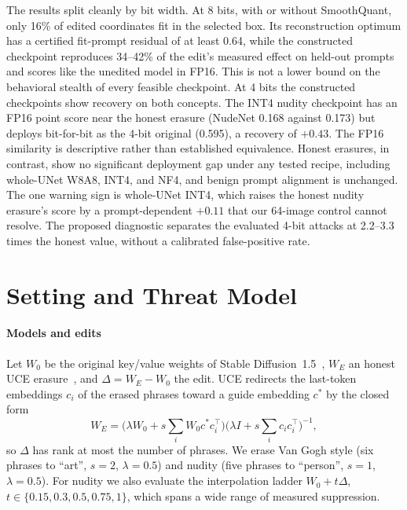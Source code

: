 \documentclass[conference]{IEEEtran}
\begin{document}
The results split cleanly by bit width. At 8 bits, with or without SmoothQuant, only
16\% of edited coordinates fit in the selected box. Its reconstruction optimum has
a certified fit-prompt residual of at least 0.64, while the constructed checkpoint
reproduces 34--42\% of the edit's measured effect on held-out prompts and scores
like the unedited model in FP16. This is not a lower bound on the behavioral stealth
of every feasible checkpoint. At 4 bits the constructed checkpoints show recovery on
both concepts. The INT4 nudity checkpoint has an FP16 point score near the honest
erasure (NudeNet
0.168 against 0.173) but deploys bit-for-bit as the 4-bit original (0.595), a
recovery of $+0.43$. The FP16 similarity is descriptive rather than established
equivalence. Honest erasures, in contrast, show no significant deployment
gap under any tested recipe, including whole-UNet W8A8, INT4, and NF4, and benign
prompt alignment is unchanged. The one warning sign is whole-UNet INT4, which raises
the honest nudity erasure's score by a prompt-dependent $+0.11$ that our 64-image
control cannot resolve. The proposed diagnostic separates the evaluated 4-bit
attacks at 2.2--3.3 times the honest value, without a calibrated false-positive rate.
\section{Setting and Threat Model}
\label{sec:setting}
\paragraph{Models and edits}
Let $W_0$ be the original key/value weights of Stable Diffusion~1.5~\cite{ldm},
$W_E$ an honest UCE erasure~\cite{uce}, and $\Delta=W_E-W_0$ the edit. UCE redirects
the last-token embeddings $c_i$ of the erased phrases toward a guide embedding $c^*$
by the closed form
\begin{equation}
 W_E=\Big(\lambda W_0+s\sum_i W_0c^*c_i^\top\Big)\Big(\lambda I+s\sum_ic_ic_i^\top\Big)^{-1},
\end{equation}
so $\Delta$ has rank at most the number of phrases. We erase Van Gogh style (six
phrases to ``art'', $s{=}2$, $\lambda{=}0.5$) and nudity (five phrases to ``person'',
$s{=}1$, $\lambda{=}0.5$). For nudity we also evaluate the interpolation ladder
$W_0+t\Delta$, $t\in\{0.15,0.3,0.5,0.75,1\}$, which spans a wide range of measured
suppression.
\end{document}

